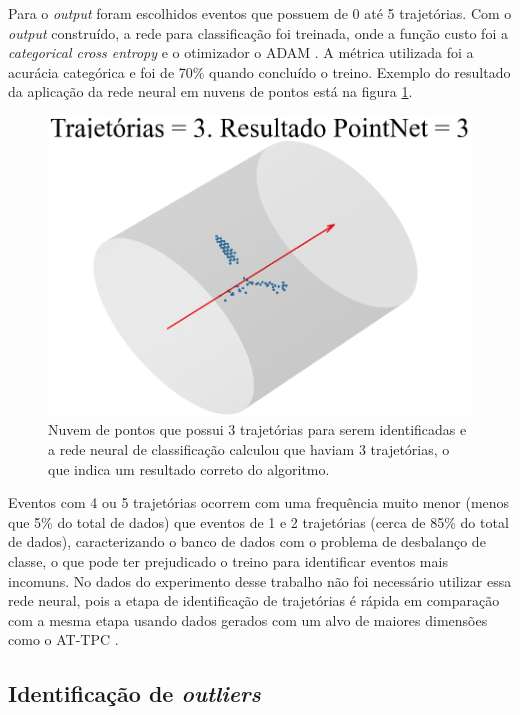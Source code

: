 \documentclass[a4paper,12pt,oneside]{book}
\begin{document}
\par Para o \textit{output} foram escolhidos eventos que possuem de 0 até 5 trajetórias. Com o \textit{output} construído, a rede para classificação foi treinada, onde a função custo foi a \textit{categorical cross entropy} \cite{MSE_CEF_review} e o otimizador o ADAM \cite{ADAMAX}. A métrica utilizada foi a acurácia categórica e foi de 70\% quando concluído o treino. Exemplo do resultado da aplicação da rede neural em nuvens de pontos está na figura \ref{fig:pointnet_class_exs}.

\begin{figure}[H]
    \centering
    \includegraphics[scale = 0.5]{figs/ex1_pointnet_class.png}
    \caption{Nuvem de pontos que possui 3 trajetórias para serem identificadas e a rede neural de classificação calculou que haviam 3 trajetórias, o que indica um resultado correto do algoritmo.}
    \label{fig:pointnet_class_exs}
\end{figure}

\par Eventos com 4 ou 5 trajetórias ocorrem com uma frequência muito menor (menos que 5\% do total de dados) que eventos de 1 e 2 trajetórias (cerca de 85\% do total de dados), caracterizando o banco de dados com o problema de desbalanço de classe, o que pode ter prejudicado o treino para identificar eventos mais incomuns. No dados do experimento desse trabalho não foi necessário utilizar essa rede neural, pois a etapa de identificação de trajetórias é rápida em comparação com a mesma etapa usando dados gerados com um alvo de maiores dimensões como o AT-TPC \cite{attpc, FORTINO2022166497}.

\subsection{Identificação de \textit{outliers}}
\end{document}
